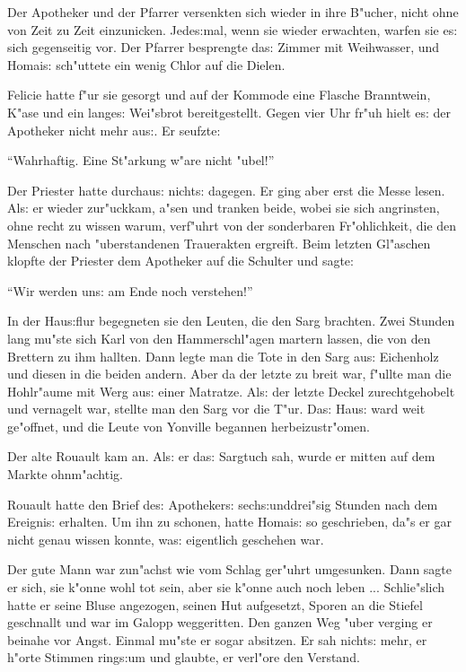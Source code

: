 \documentclass[oneside,12pt]{book}
\newcommand{\s}{s:}%
\begin{document}
Der Apotheker und der Pfarrer versenkten sich wieder in ihre
B"ucher, nicht ohne von Zeit zu Zeit einzunicken. Jede{\s}mal,
wenn sie wieder erwachten, warfen sie e{\s} sich gegenseitig vor.
Der Pfarrer besprengte da{\s} Zimmer mit Weihwasser, und Homai{\s}
sch"uttete ein wenig Chlor auf die Dielen.

Felicie hatte f"ur sie gesorgt und auf der Kommode eine Flasche
Branntwein, K"ase und ein lange{\s} Wei"sbrot bereitgestellt.
Gegen vier Uhr fr"uh hielt e{\s} der Apotheker nicht mehr au{\s}.
Er seufzte:

"`Wahrhaftig. Eine St"arkung w"are nicht "ubel!"'

Der Priester hatte durchau{\s} nicht{\s} dagegen. Er ging aber
erst die Messe lesen. Al{\s} er wieder zur"uckkam, a"sen und
tranken beide, wobei sie sich angrinsten, ohne recht zu wissen
warum, verf"uhrt von der sonderbaren Fr"ohlichkeit, die den
Menschen nach "uberstandenen Trauerakten ergreift. Beim letzten
Gl"aschen klopfte der Priester dem Apotheker auf die Schulter und
sagte:

"`Wir werden un{\s} am Ende noch verstehen!"'

In der Hau{\s}flur begegneten sie den Leuten, die den Sarg
brachten. Zwei Stunden lang mu"ste sich Karl von den
Hammerschl"agen martern lassen, die von den Brettern zu ihm
hallten. Dann legte man die Tote in den Sarg au{\s} Eichenholz und
diesen in die beiden andern. Aber da der letzte zu breit war,
f"ullte man die Hohlr"aume mit Werg au{\s} einer Matratze. Al{\s}
der letzte Deckel zurechtgehobelt und vernagelt war, stellte man
den Sarg vor die T"ur. Da{\s} Hau{\s} ward weit ge"offnet, und die
Leute von Yonville begannen herbeizustr"omen.

Der alte Rouault kam an. Al{\s} er da{\s} Sargtuch sah, wurde er
mitten auf dem Markte ohnm"achtig.


\newpage\begin{center}
{\large \so{Elfte{\s} Kapitel}}\bigskip\bigskip
\end{center}

Rouault hatte den Brief de{\s} Apotheker{\s} sech{\s}unddrei"sig
Stunden nach dem Ereigni{\s} erhalten. Um ihn zu schonen, hatte
Homai{\s} so geschrieben, da"s er gar nicht genau wissen konnte,
wa{\s} eigentlich geschehen war.

Der gute Mann war zun"achst wie vom Schlag ger"uhrt umgesunken.
Dann sagte er sich, sie k"onne wohl tot sein, aber sie k"onne auch
noch leben ... Schlie"slich hatte er seine Bluse angezogen, seinen
Hut aufgesetzt, Sporen an die Stiefel geschnallt und war im Galopp
weggeritten. Den ganzen Weg "uber verging er beinahe vor Angst.
Einmal mu"ste er sogar absitzen. Er sah nicht{\s} mehr, er h"orte
Stimmen ring{\s}um und glaubte, er verl"ore den Verstand.
\end{document}
